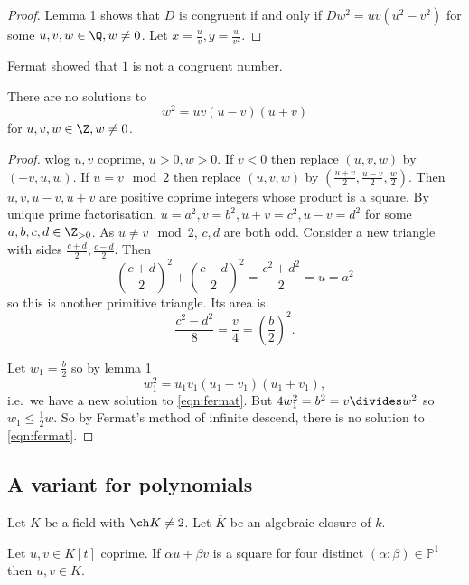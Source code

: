\documentclass[a4paper]{article}
\theoremstyle{definition}
\theoremstyle{theorem}
\renewcommand*{\P}{\mathbb{P}}
\begin{document}
\begin{proof}
  Lemma 1 shows that \(D\) is congruent if and only if \(Dw^2 = uv(u^2 - v^2)\) for some \(u, v, w \in \Q, w \neq 0\). Let \(x = \frac{u}{v}, y = \frac{w}{v^2}\).
\end{proof}

Fermat showed that \(1\) is not a congruent number.

\begin{theorem}
  There are no solutions to
  \begin{equation}
    \label{eqn:fermat}
    w^2 = uv (u - v)(u + v)
    \tag{\ast}
  \end{equation}
  for \(u, v, w \in \Z, w \neq 0\).
\end{theorem}

\begin{proof}
  wlog \(u, v \) coprime, \(u > 0, w > 0\). If \(v < 0\) then replace \((u, v, w)\) by \((-v, u, w)\). If \(u = v \mod 2\) then replace \((u, v, w)\) by \((\frac{u + v}{2}, \frac{u - v}{2}, \frac{w}{2})\). Then \(u, v, u - v, u + v\) are positive coprime integers whose product is a square. By unique prime factorisation, \(u = a^2, v = b^2, u + v = c^2, u - v = d^2\) for some \(a, b, c, d \in \Z_{> 0}\). As \(u \neq v \mod 2\), \(c, d\) are both odd. Consider a new triangle with sides \(\frac{c + d}{2}, \frac{c - d}{2}\). Then
  \[
    \left( \frac{c + d}{2} \right)^2 + \left( \frac{c - d}{2} \right)^2 = \frac{c^2 + d^2}{2} = u = a^2
  \]
  so this is another primitive triangle. Its area is
  \[
    \frac{c^2 - d^2}{8} = \frac{v}{4} = \left( \frac{b}{2} \right)^2.
  \]

  Let \(w_1 = \frac{b}{2}\) so by lemma 1
  \[
    w_1^2 = u_1v_1 (u_1 - v_1)(u_1 + v_1),
  \]
  i.e.\ we have a new solution to \eqref{eqn:fermat}. But \(4 w_1^2 = b^2 = v \divides w^2\) so \(w_1 \leq \frac{1}{2} w\). So by Fermat's method of infinite descend, there is no solution to \eqref{eqn:fermat}.
\end{proof}

\subsection{A variant for polynomials}

Let \(K\) be a field with \(\ch K \neq 2\). Let \(\overline K\) be an algebraic closure of \(k\).

\begin{lemma}
  Let \(u, v \in K[t]\) coprime. If \(\alpha u + \beta v\) is a square for four distinct \((\alpha: \beta) \in \P^1\) then \(u, v \in K\).
\end{lemma}
\end{document}

